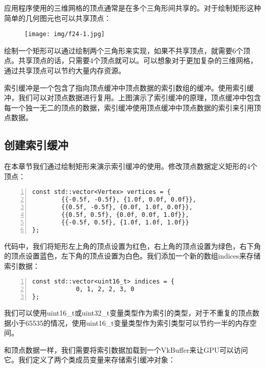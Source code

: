 \documentclass{ctexart}
\begin{document}
应用程序使用的三维网格的顶点通常是在多个三角形间共享的。对于绘制矩形这种简单的几何图元也可以共享顶点：

\begin{figure}[H]
	\centering
	\texttt{[image: img/f24-1.jpg]}
\end{figure}

绘制一个矩形可以通过绘制两个三角形来实现，如果不共享顶点，就需要6个顶点。共享顶点的话，只需要4个顶点就可以。可以想象对于更加复杂的三维网格，通过共享顶点可以节约大量内存资源。

索引缓冲是一个包含了指向顶点缓冲中顶点数据的索引数组的缓冲。使用索引缓冲，我们可以对顶点数据进行复用。上图演示了索引缓冲的原理，顶点缓冲中包含每一个独一无二的顶点的数据，索引缓冲使用顶点缓冲中顶点数据的索引来引用顶点数据。

\subsection{创建索引缓冲}

在本章节我们通过绘制矩形来演示索引缓冲的使用。修改顶点数据定义矩形的4个顶点：

\begin{lstlisting}[language={[ANSI]C},keywordstyle=\color{blue!70},commentstyle=\color{red!50!green!50!blue!50},frame=shadowbox, rulesepcolor=\color{red!20!green!20!blue!20},basicstyle=\small,numbers=left, numberstyle=\tiny,breaklines=true]
const std::vector<Vertex> vertices = {
		{{-0.5f, -0.5f}, {1.0f, 0.0f, 0.0f}},
		{{0.5f, -0.5f}, {0.0f, 1.0f, 0.0f}},
		{{0.5f, 0.5f}, {0.0f, 0.0f, 1.0f}},
		{{-0.5f, 0.5f}, {1.0f, 1.0f, 1.0f}}
};
\end{lstlisting}

代码中，我们将矩形左上角的顶点设置为红色，右上角的顶点设置为绿色，右下角的顶点设置蓝色，左下角的顶点设置为白色。我们添加一个新的数组indices来存储索引数据：

\begin{lstlisting}[language={[ANSI]C},keywordstyle=\color{blue!70},commentstyle=\color{red!50!green!50!blue!50},frame=shadowbox, rulesepcolor=\color{red!20!green!20!blue!20},basicstyle=\small,numbers=left, numberstyle=\tiny,breaklines=true]
const std::vector<uint16_t> indices = {
			0, 1, 2, 2, 3, 0
};
\end{lstlisting}

我们可以使用uint16\_t或uint32\_t变量类型作为索引的类型，对于不重复的顶点数据小于65535的情况，使用uint16\_t变量类型作为索引类型可以节约一半的内存空间。

和顶点数据一样，我们需要将索引数据加载到一个VkBuffer来让GPU可以访问它。我们定义了两个类成员变量来存储索引缓冲对象：
\end{document}
